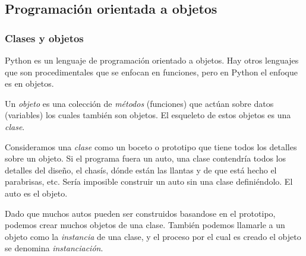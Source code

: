 \subsection{Programación orientada a objetos}\label{subsec: poo}
	\subsubsection{Clases y objetos}
	Python es un lenguaje de programación orientado a objetos. Hay otros lenguajes que son procedimentales que se enfocan en funciones, pero en Python el enfoque es en objetos.\par 
	Un \emph{objeto} es una colección de \emph{métodos} (funciones) que actúan sobre datos (variables) los cuales también son objetos. El esqueleto de estos objetos es una \emph{clase}.\par 
	Consideramos una \emph{clase} como un boceto o prototipo que tiene todos los detalles sobre un objeto. Si el programa fuera un auto, una clase contendría todos los detalles del diseño, el chasís, dónde están las llantas y de que está hecho el parabrisas, etc. Sería imposible construir un auto sin una clase definiéndolo. El auto es el objeto.\par 
	Dado que muchos autos pueden ser construidos  basandose en el prototipo, podemos crear muchos objetos de una clase. También podemos llamarle a un objeto como la \emph{instancia} de una clase, y el proceso por el cual es creado el objeto se denomina \emph{instanciación}.
